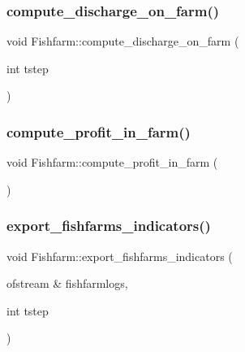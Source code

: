 \mbox{\label{class_fishfarm_ab5f99c184bfdca6613c2d61711e27f69}} 
\subsubsection{\texorpdfstring{compute\_discharge\_on\_farm()}{compute\_discharge\_on\_farm()}}
{\footnotesize\ttfamily void Fishfarm\+::compute\+\_\+discharge\+\_\+on\+\_\+farm (\begin{DoxyParamCaption}\item[{int}]{tstep }\end{DoxyParamCaption})}

\mbox{\label{class_fishfarm_a0ae5fcb1362cbfdeb5cdf27f1788c0f9}} 
\subsubsection{\texorpdfstring{compute\_profit\_in\_farm()}{compute\_profit\_in\_farm()}}
{\footnotesize\ttfamily void Fishfarm\+::compute\+\_\+profit\+\_\+in\+\_\+farm (\begin{DoxyParamCaption}{ }\end{DoxyParamCaption})}

\mbox{\label{class_fishfarm_a70ca59f8c2557e3e59e697a6b6f2b295}} 
\subsubsection{\texorpdfstring{export\_fishfarms\_indicators()}{export\_fishfarms\_indicators()}}
{\footnotesize\ttfamily void Fishfarm\+::export\+\_\+fishfarms\+\_\+indicators (\begin{DoxyParamCaption}\item[{ofstream \&}]{fishfarmlogs,  }\item[{int}]{tstep }\end{DoxyParamCaption})}

